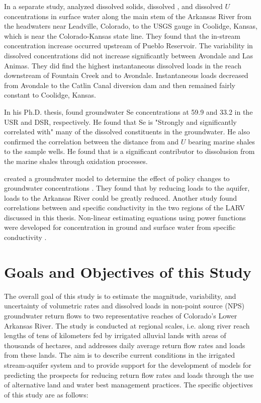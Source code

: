 \begin{linenumbers}[1]
In a separate study, \textcite{Miller2010} analyzed dissolved solids, dissolved \Se, and dissolved $ U $ concentrations in surface water along the main stem of the Arkansas River from the headwaters near Leadville, Colorado, to the USGS gauge in Coolidge, Kansas, which is near the Colorado-Kansas state line.  They found that the in-stream \Se concentration increase occurred upstream of Pueblo Reservoir.  The variability in dissolved \Se concentrations did not increase significantly between Avondale and Las Animas.  They did find the highest instantaneous dissolved \Se loads in the reach downstream of Fountain Creek and to Avondale.  Instantaneous loads decreased from Avondale to the Catlin Canal diversion dam and then remained fairly constant to Coolidge, Kansas.

In his Ph.D. thesis, \textcite{2010Cody} found groundwater Se concentrations at \SI{59.9}{\mgl} and \SI{33.2}{\mgl} in the USR and DSR, respectively.  He found that Se is "Strongly and significantly correlated with" many of the dissolved constituents in the groundwater.  He also confirmed the correlation between the distance from \Se and $ U $ bearing marine shales to the sample wells.  He found that \nitrate is a significant contributor to \Se dissolusion from the marine shales through oxidation processes.

\textcite{Bailey2012} created a groundwater model to determine the effect of policy changes to groundwater \Se concentrations .  They found that by reducing \nitrate loads to the aquifer, \Se loads to the Arkansas River could be greatly reduced.  Another study found correlations between \Se and specific conductivity in the two regions of the LARV discussed in this thesis.  Non-linear estimating equations using power functions were developed for \Se concentration in ground and surface water from specific conductivity \parencite{2010Cody}.

\section{Goals and Objectives of this Study}
The overall goal of this study is to estimate the magnitude, variability, and uncertainty of volumetric rates and dissolved \Se loads in non-point source (NPS) groundwater return flows to two representative reaches of Colorado's Lower Arkansas River.  The study is conducted at regional scales, i.e. along river reach lengths of tens of kilometers fed by irrigated alluvial lands with areas of thousands of hectares, and addresses daily average return flow rates and \Se loads from these lands.  The aim is to describe current conditions in the irrigated stream-aquifer system and to provide support for the development of models for predicting the prospects for reducing return flow rates and \Se loads through the use of alternative land and water best management practices.  The specific objectives of this study are as follows:


\end{linenumbers}

